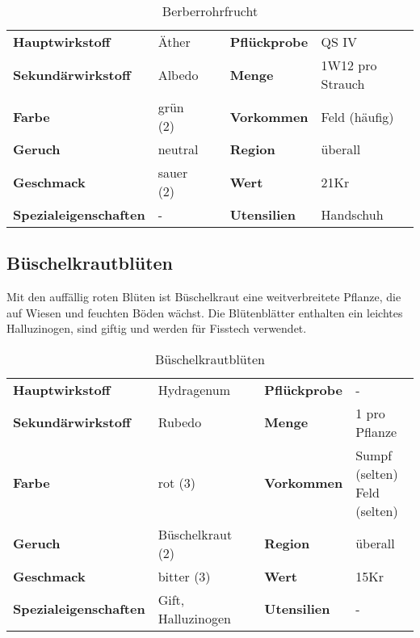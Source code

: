 \begin{table}[h]
\begin{center}
\begin{tabular}{|l|l|p{1cm}|l|l|}
	\cline{1-2} \cline{4-5}
	\textbf{Hauptwirkstoff} & Äther && \textbf{Pflückprobe} & QS IV \\ \cline{1-2} \cline{4-5}
	\textbf{Sekundärwirkstoff} & Albedo && \textbf{Menge} & 1W12 pro Strauch \\ \cline{1-2} \cline{4-5}
	\textbf{Farbe} & grün (2) && \textbf{Vorkommen} & Feld (häufig) \\ \cline{1-2} \cline{4-5}
	\textbf{Geruch} & neutral && \textbf{Region} & überall \\ \cline{1-2} \cline{4-5}
	\textbf{Geschmack} & sauer (2) && \textbf{Wert} & 21Kr \\ \cline{1-2} \cline{4-5}
	\textbf{Spezialeigenschaften} & - && \textbf{Utensilien} & Handschuh \\ \cline{1-2} \cline{4-5}
\end{tabular}
\end{center}
\caption{Berberrohrfrucht}
\label{tab:berberrohrfrucht}
\end{table}


\subsection{Büschelkrautblüten}
Mit den auffällig roten Blüten ist Büschelkraut eine weitverbreitete Pflanze, die auf Wiesen und feuchten Böden wächst. Die Blütenblätter enthalten ein leichtes Halluzinogen, sind giftig und werden für Fisstech verwendet. 

\begin{table}[h] 
\begin{center} 
\begin{tabular}{|l|l|p{1cm}|l|l|} 
  	\cline{1-2} \cline{4-5} 
  	\textbf{Hauptwirkstoff} & Hydragenum && \textbf{Pflückprobe} & - \\ \cline{1-2} \cline{4-5} 
  	\textbf{Sekundärwirkstoff} & Rubedo && \textbf{Menge} & 1 pro Pflanze \\ \cline{1-2} \cline{4-5} 
  	\textbf{Farbe} & rot (3) && \textbf{Vorkommen} & \brcell{Sumpf (selten)\\Feld (selten)} \\ \cline{1-2} \cline{4-5} 
  	\textbf{Geruch} & Büschelkraut (2) && \textbf{Region} & überall \\ \cline{1-2} \cline{4-5} 
  	\textbf{Geschmack} & bitter (3) && \textbf{Wert} & 15Kr \\ \cline{1-2} \cline{4-5} 
  	\textbf{Spezialeigenschaften} & Gift, Halluzinogen && \textbf{Utensilien} & - \\ \cline{1-2} \cline{4-5} 
\end{tabular} 
\end{center} 
\caption{Büschelkrautblüten} 
\label{tab:bueschelkrautblueten} 
\end{table}


